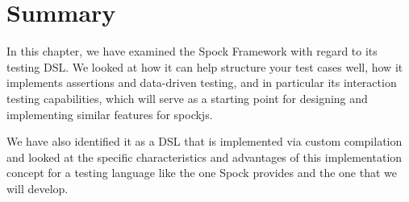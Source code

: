 \section{Summary}
In this chapter,
we have examined the Spock Framework
with regard to its testing DSL.
We looked at how it can help structure your test cases well,
how it implements assertions and data-driven testing,
and in particular its interaction testing capabilities,
which will serve as a starting point for
designing and implementing similar features for spockjs.

We have also identified it as a DSL that is implemented via custom compilation
and looked at the specific characteristics and advantages of this implementation concept
for a testing language like the one Spock provides and the one that we will develop.
